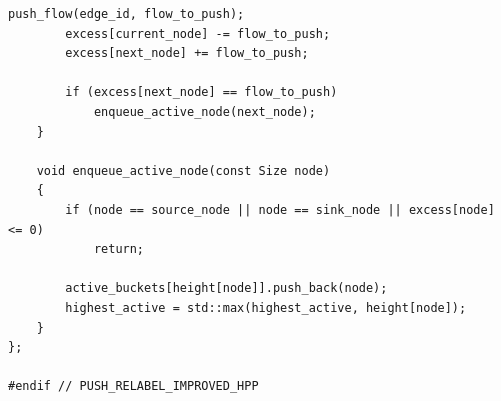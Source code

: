 \documentclass[12pt,a4paper]{article}
\begin{document}
\begin{lstlisting}[caption={Implementação em C++ da classe \lstinline{PushRelabelImproved}, otimizada empiricamente com a Heurística de Lacuna (\textit{Gap Heuristic}).}, label={lst:push_relabel_improved}]
		push_flow(edge_id, flow_to_push);
		excess[current_node] -= flow_to_push;
		excess[next_node] += flow_to_push;

		if (excess[next_node] == flow_to_push)
			enqueue_active_node(next_node);
	}

	void enqueue_active_node(const Size node)
	{
		if (node == source_node || node == sink_node || excess[node] <= 0)
			return;

		active_buckets[height[node]].push_back(node);
		highest_active = std::max(highest_active, height[node]);
	}
};

#endif // PUSH_RELABEL_IMPROVED_HPP
\end{lstlisting}

\newpage

\label{ap:costnetwork}
\end{document}
